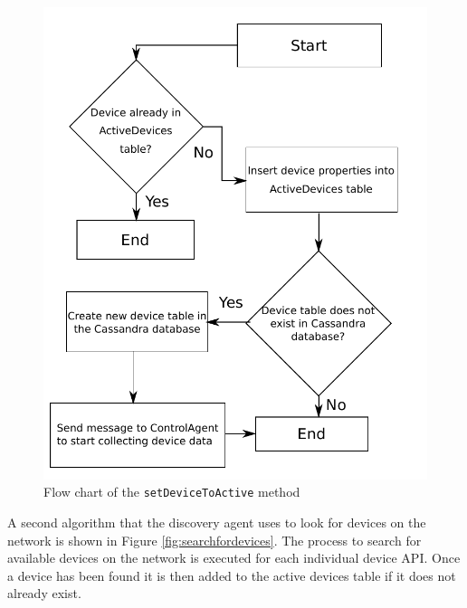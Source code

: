 \documentclass[letterpaper,12pt]{article}   %
\begin{document}
\begin{figure}[H]
    \centering
    \includegraphics[scale=0.5]{figs/setDeviceToActiveFlow.pdf}
    \caption{Flow chart of the \texttt{setDeviceToActive} method}
    \label{fig:setdevicetoactive}
\end{figure}

A second algorithm that the discovery agent uses to look for devices on the network is shown in Figure \ref{fig:searchfordevices}. The process to search for available devices on the network is executed for each individual device API. Once a device has been found it is then added to the active devices table if it does not already exist.
\end{document}
